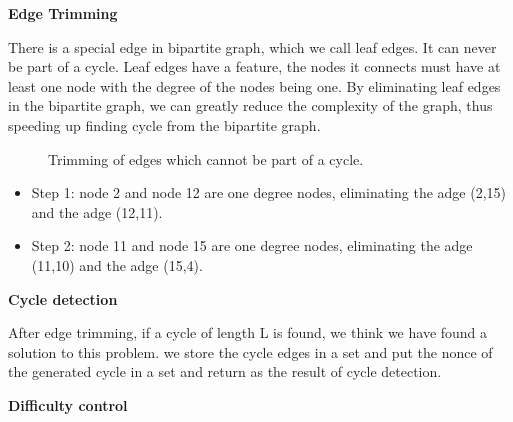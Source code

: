 \documentclass[a4paper,11pt]{article}
\begin{document}
\textbf{Edge Trimming}

There is a special edge in bipartite graph, which we call leaf edges. It can never be part of a cycle.
Leaf edges have a feature, the nodes it connects must have at least one node with the degree of the nodes being one.
By eliminating leaf edges in the bipartite graph, we can greatly reduce the complexity of the graph,
thus speeding up finding cycle from the bipartite graph.

\begin{figure}[h]
	\centerline{%
	}
	\caption{Trimming of edges which cannot be part of a cycle.}
\end{figure}

\begin{itemize}
	\item Step 1: node 2 and node 12 are one degree nodes, eliminating the adge (2,15) and the adge (12,11).
	\item Step 2: node 11 and node 15 are one degree nodes, eliminating the adge (11,10) and the adge (15,4).
\end{itemize}


\textbf{Cycle detection}

After edge trimming, if a cycle of length L is found, we think we have found a solution to this problem.
we store the cycle edges in a set and put the nonce of the generated cycle in a set and
return as the result of cycle detection.


\textbf{Difficulty control}
\end{document}
